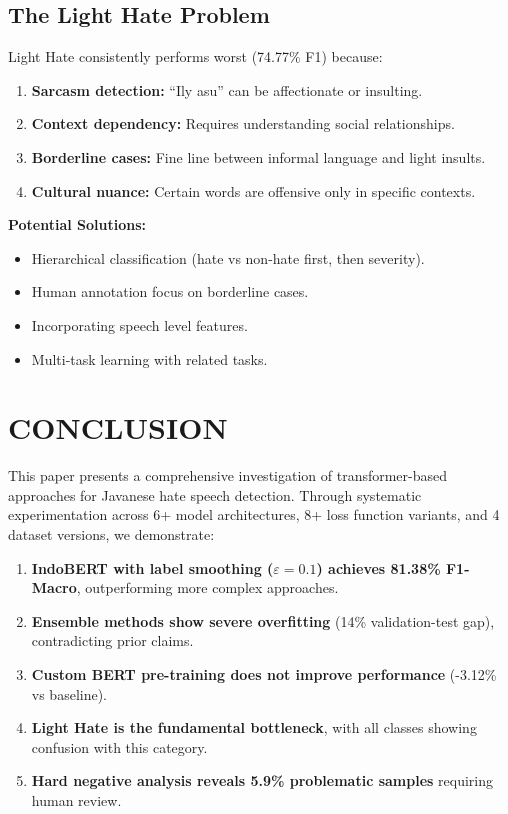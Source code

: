 \documentclass[10pt,journal]{IEEEtran}
\begin{document}
\subsection{The Light Hate Problem}

Light Hate consistently performs worst (74.77\% F1) because:

\begin{enumerate}[leftmargin=*,noitemsep,topsep=0pt]
\item \textbf{Sarcasm detection:} ``Ily asu'' can be affectionate or insulting.
\item \textbf{Context dependency:} Requires understanding social relationships.
\item \textbf{Borderline cases:} Fine line between informal language and light insults.
\item \textbf{Cultural nuance:} Certain words are offensive only in specific contexts.
\end{enumerate}

\textbf{Potential Solutions:}
\begin{itemize}[leftmargin=*,noitemsep,topsep=0pt]
\item Hierarchical classification (hate vs non-hate first, then severity).
\item Human annotation focus on borderline cases.
\item Incorporating speech level features.
\item Multi-task learning with related tasks.
\end{itemize}

\section{CONCLUSION}

This paper presents a comprehensive investigation of transformer-based approaches for Javanese hate speech detection. Through systematic experimentation across 6+ model architectures, 8+ loss function variants, and 4 dataset versions, we demonstrate:

\begin{enumerate}[leftmargin=*,noitemsep,topsep=0pt]
\item \textbf{IndoBERT with label smoothing ($\varepsilon=0.1$) achieves 81.38\% F1-Macro}, outperforming more complex approaches.
\item \textbf{Ensemble methods show severe overfitting} (14\% validation-test gap), contradicting prior claims.
\item \textbf{Custom BERT pre-training does not improve performance} (-3.12\% vs baseline).
\item \textbf{Light Hate is the fundamental bottleneck}, with all classes showing confusion with this category.
\item \textbf{Hard negative analysis reveals 5.9\% problematic samples} requiring human review.
\end{enumerate}
\end{document}
